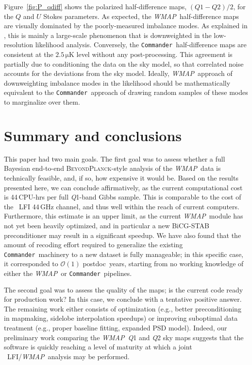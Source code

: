 \documentclass[twocolumn]{aa}
\def\WMAP{\emph{WMAP}}
\def\commander{\texttt{Commander}}
\newcommand{\BP}{\textsc{BeyondPlanck}}
\newcommand{\Q}[0]{\textit Q}
\begin{document}
Figure~\ref{fig:P_qdiff} shows the polarized half-difference maps, ${(\mathit
Q1-\mathit Q2)/2}$, for the $Q$ and $U$ Stokes parameters. As expected, the
\WMAP\ half-difference maps are visually dominated by the poorly-measured imbalance modes.
As explained in \citet{jarosik2007},
this is mainly a large-scale phenomenon that is downweighted in the
low-resolution likelihood analysis. Conversely, the \commander\ half-difference
maps are consistent at the $2.5\,\mathrm{\mu K}$ level without any
post-processing. This agreement is partially due to conditioning the data on
the sky model, so that correlated noise accounts for the deviations from the
sky model. Ideally, \WMAP\ approach of downweighting imbalance modes in
the likelihood should be mathematically equivalent to the \commander\ approach
of drawing random samples of these modes to marginalize over them.




\section{Summary and conclusions}
\label{sec:Conclusions}

This paper had two main goals. The first goal was to assess whether a full
Bayesian end-to-end \BP-style analysis of the \WMAP\ data is technically
feasible, and, if so, how expensive it would be. Based on the results presented
here, we can conclude affirmatively, as the current computational cost is
44\,CPU\nobreakdash-hrs per full \Q1-band Gibbs sample. This is comparable to
the cost of the \Planck\ LFI 44\,GHz channel, and thus well within the reach of
current computers. Furthermore, this estimate is an upper limit, as the current
\WMAP\ module has not yet been heavily optimized, and in particular a new
BiCG-STAB preconditioner may result in a significant speedup. We have also
found that the amount of recoding effort required to generalize the existing
\commander\ machinery to a new dataset is fully manageable; in this specific
case, it corresponded to $\mathcal O(1)$ postdoc~years, starting from no working
knowledge of either the \WMAP\ or \commander\ pipelines.

The second goal was to assess the quality of the maps; is the current code
ready for production work? In this case, we conclude with a tentative positive
answer.  The remaining work either consists of optimization (e.g., better
preconditioning in mapmaking, sidelobe interpolation speedups) or improving 
suboptimal data treatment (e.g., proper baseline fitting, expanded PSD model).
Indeed, our preliminary work comparing the \WMAP\ \Q1 and \Q2 sky maps suggests
that the software is quickly reaching a level of maturity at which a joint
\Planck\ LFI/\WMAP\ analysis may be performed.
\end{document}
